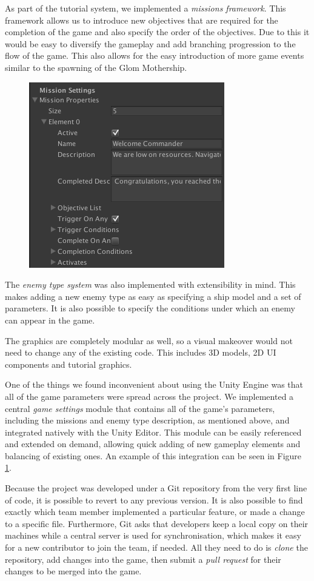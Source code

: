 \documentclass[a4paper,11pt]{article}
\begin{document}
As part of the tutorial system, we implemented a \emph{missions framework}. This framework allows us to introduce new objectives that are required for the completion of the game and also specify the order of the objectives. Due to this it would be easy to diversify the gameplay and add branching progression to the flow of the game. This also allows for the easy introduction of more game events similar to the spawning of the Glom Mothership.

\begin{figure}
	\centering
	\includegraphics[width=.32\textwidth]{modular_missions}
    \label{fig:modular_missions}
\end{figure}

The \emph{enemy type system} was also implemented with extensibility in mind. This makes adding a new enemy type as easy as specifying a ship model and a set of parameters. It is also possible to specify the conditions under which an enemy can appear in the game.

The graphics are completely modular as well, so a visual makeover would not need to change any of the existing code. This includes 3D models, 2D UI components and tutorial graphics.

One of the things we found inconvenient about using the Unity Engine was that all of the game parameters were spread across the project. We implemented a central \emph{game settings} module that contains all of the game's parameters, including the missions and enemy type description, as mentioned above, and integrated natively with the Unity Editor. This module can be easily referenced and extended on demand, allowing quick adding of new gameplay elements and balancing of existing ones. An example of this integration can be seen in Figure \ref{fig:modular_missions}.


Because the project was developed under a Git repository from the very first line of code, it is possible to revert to any previous version. It is also possible to find exactly which team member implemented a particular feature, or made a change to a specific file. Furthermore, Git asks that developers keep a local copy on their machines while a central server is used for synchronisation, which makes it easy for a new contributor to join the team, if needed. All they need to do is \emph{clone} the repository, add changes into the game, then submit a \emph{pull request} for their changes to be merged into the game.
\end{document}
